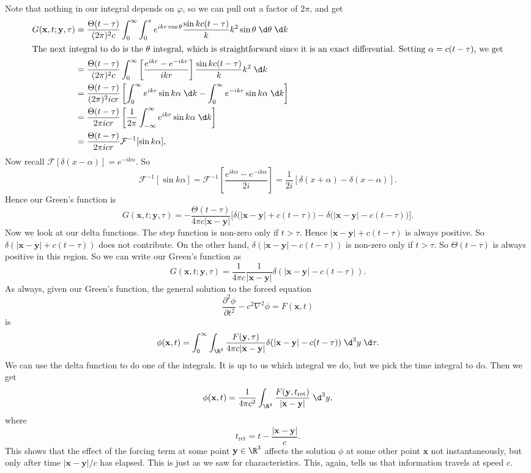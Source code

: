 \documentclass[a4paper]{article}
\begin{document}
Note that nothing in our integral depends on $\varphi$, so we can pull out a factor of $2\pi$, and get
\begin{align*}
  G(\mathbf{x}, t; \mathbf{y}, \tau) &= \frac{\Theta(t - \tau)}{(2 \pi)^2 c} \int_0^\infty \int_0^\pi e^{ik r\cos \theta} \frac{\sin kc(t - \tau)}{k} k^2 \sin \theta \;\d \theta \;\d k\\
  \intertext{The next integral to do is the $\theta$ integral, which is straightforward since it is an exact differential. Setting $\alpha = c(t - \tau)$, we get}
  &= \frac{\Theta(t - \tau)}{(2\pi)^2 c} \int_0^\infty \left[\frac{e^{ikr} - e^{-ikr}}{ikr}\right] \frac{\sin kc(t - \tau)}{k} k^2 \;\d k\\
  &= \frac{\Theta(t - \tau)}{(2\pi)^2 icr} \left[\int_0^\infty e^{ikr} \sin k\alpha\;\d k - \int_0^\infty e^{-ikr} \sin k\alpha\;\d k\right]\\
  &= \frac{\Theta(t - \tau)}{2\pi i c r} \left[\frac{1}{2\pi} \int_{-\infty}^\infty e^{ikr} \sin k\alpha \;\d k\right]\\
  &= \frac{\Theta(t - \tau)}{ 2\pi i c r} \mathcal{F}^{-1}[\sin k \alpha],
\end{align*}
Now recall $\mathcal{F}[\delta(x - \alpha)] = e^{-ik\alpha}$. So
\[
  \mathcal{F}^{-1}[\sin k\alpha] = \mathcal{F}^{-1} \left[\frac{e^{ik\alpha} - e^{-ik\alpha}}{2 i}\right] = \frac{1}{2i} [\delta(x + \alpha) - \delta(x - \alpha)].
\]
Hence our Green's function is
\[
  G(\mathbf{x}, t; \mathbf{y}, \tau) = -\frac{\Theta(t - \tau)}{4\pi c |\mathbf{x} - \mathbf{y}|}\Big[\delta\big(|\mathbf{x} - \mathbf{y}| + c(t - \tau)\big) - \delta\big(|\mathbf{x} - \mathbf{y}| - c(t - \tau)\big)\Big].
\]
Now we look at our delta functions. The step function is non-zero only if $t > \tau$. Hence $|\mathbf{x} - \mathbf{y}| + c(t - \tau)$ is always positive. So $\delta(|\mathbf{x} - \mathbf{y}| + c(t - \tau))$ does not contribute. On the other hand, $\delta(|\mathbf{x} - \mathbf{y}| - c(t - \tau))$ is non-zero only if $t > \tau$. So $\Theta(t - \tau)$ is always positive in this region. So we can write our Green's function as
\[
  G(\mathbf{x}, t; \mathbf{y}, \tau) = \frac{1}{4\pi c} \frac{1}{|\mathbf{x} - \mathbf{y}|} \delta(|\mathbf{x} - \mathbf{y}| - c(t - \tau)).
\]
As always, given our Green's function, the general solution to the forced equation
\[
  \frac{\partial^2 \phi}{\partial t^2} - c^2 \nabla^2 \phi = F(\mathbf{x}, t)
\]
is
\[
  \phi(\mathbf{x}, t) = \int_0^\infty \int_{\R^3} \frac{F(\mathbf{y}, \tau)}{4\pi c|\mathbf{x} - \mathbf{y}|} \delta(|\mathbf{x} - \mathbf{y}| - c(t - \tau)) \;\d^3 y\;\d \tau.
\]
We can use the delta function to do one of the integrals. It is up to us which integral we do, but we pick the time integral to do. Then we get
\[
  \phi(\mathbf{x}, t) = \frac{1}{4\pi c^2} \int_{\R^3} \frac{F(\mathbf{y}, t_{\mathrm{ret}})}{|\mathbf{x} - \mathbf{y}|} \;\d^3 y,
\]
where
\[
  t_{\mathrm{ret}} = t - \frac{|\mathbf{x} - \mathbf{y}|}{c}.
\]
This shows that the effect of the forcing term at some point $\mathbf{y} \in \R^3$ affects the solution $\phi$ at some other point $\mathbf{x}$ not instantaneously, but only after time $|\mathbf{x} - \mathbf{y}|/c$ has elapsed. This is just as we saw for characteristics. This, again, tells us that information travels at speed $c$.
\end{document}
